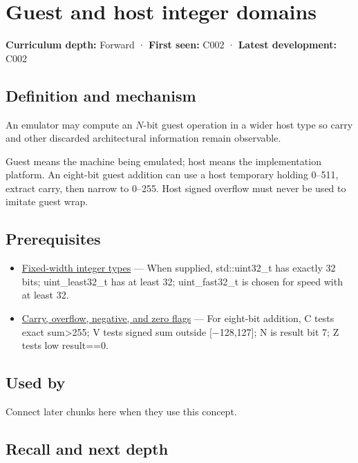 \hypertarget{appendix-33e7a011b684}{}
\section{Guest and host integer domains}\label{appendix-33e7a011b684-guest-and-host-integer-domains}

\textbf{Curriculum depth:} Forward · \textbf{First seen:} C002 · \textbf{Latest development:} C002

\subsection{Definition and mechanism}\label{appendix-33e7a011b684-definition-and-mechanism}

An emulator may compute an \(N\)-bit guest operation in a wider host type so carry and other discarded architectural information remain observable.

Guest means the machine being emulated; host means the implementation platform. An eight-bit guest addition can use a host temporary holding 0--511, extract carry, then narrow to 0--255. Host signed overflow must never be used to imitate guest wrap.

\subsection{Prerequisites}\label{appendix-33e7a011b684-prerequisites}

\begin{itemize}
\tightlist
\item
  \hyperref[appendix-cc04044b5782]{Fixed-width integer types} --- When supplied, std::uint32\_t has exactly 32 bits; uint\_least32\_t has at least 32; uint\_fast32\_t is chosen for speed with at least 32.
\item
  \hyperref[appendix-8d687c9c08ab]{Carry, overflow, negative, and zero flags} --- For eight-bit addition, C tests exact sum\textgreater255; V tests signed sum outside {[}−128,127{]}; N is result bit 7; Z tests low result==0.
\end{itemize}

\subsection{Used by}\label{appendix-33e7a011b684-used-by}

Connect later chunks here when they use this concept.

\subsection{Recall and next depth}\label{appendix-33e7a011b684-recall-and-next-depth}

